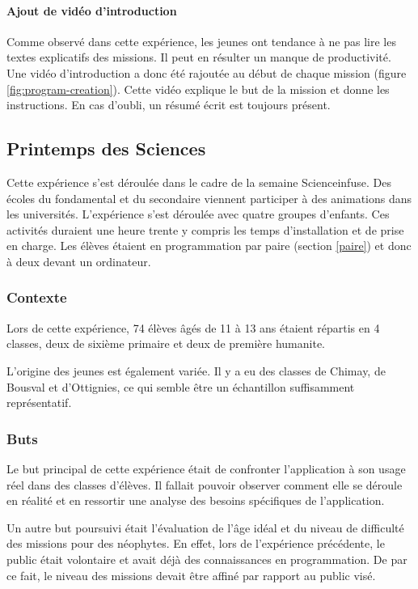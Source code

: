 \paragraph{Ajout de vidéo d'introduction}
Comme observé dans cette expérience, les jeunes ont tendance à ne pas lire les textes explicatifs des \glspl{mission}. Il peut en résulter un manque de productivité. Une vidéo d'introduction a donc été rajoutée au début de chaque \gls{mission} (figure \ref{fig:program-creation}). Cette vidéo explique le but de la \gls{mission} et donne les instructions. En cas d'oubli, un résumé écrit est toujours présent.

\subsection{Printemps des Sciences}
Cette expérience s'est déroulée dans le cadre de la semaine Scienceinfuse. Des écoles du \gls{fondamental} et du \gls{secondaire} viennent participer à des animations dans les universités. L'expérience s'est déroulée avec quatre groupes d'enfants. Ces activités duraient une heure trente y compris les temps d'installation et de prise en charge. Les élèves étaient en programmation par paire (section \ref{paire}) et donc à deux devant un ordinateur.

\subsubsection{Contexte}
Lors de cette expérience, 74 élèves âgés de 11 à 13 ans étaient répartis en 4 classes, deux de sixième \gls{primaire} et deux de première \gls{humanite}.

L'origine des jeunes est également variée. Il y a eu des classes de Chimay, de Bousval et d'Ottignies, ce qui semble être un échantillon suffisamment représentatif.

\subsubsection{Buts}
Le but principal de cette expérience était de confronter l'application à son usage réel dans des classes d'élèves. Il fallait pouvoir observer comment elle se déroule en réalité et en ressortir une analyse des besoins spécifiques de l'application.

Un autre but poursuivi était l'évaluation de l'âge idéal et du niveau de difficulté des \glspl{mission} pour des néophytes. En effet, lors de l'expérience précédente, le public était volontaire et avait déjà des connaissances en programmation. De par ce fait, le niveau des \glspl{mission} devait être affiné par rapport au public visé.

